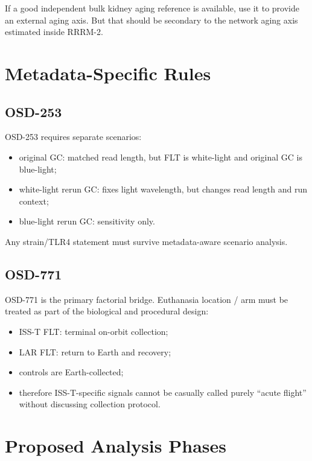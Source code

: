 \documentclass[11pt]{article}
\begin{document}
If a good independent bulk kidney aging reference is available, use it to provide
an external aging axis. But that should be secondary to the network aging axis
estimated inside RRRM-2.

\section{Metadata-Specific Rules}

\subsection{OSD-253}

OSD-253 requires separate scenarios:

\begin{itemize}
  \item original GC: matched read length, but FLT is white-light and original GC
        is blue-light;
  \item white-light rerun GC: fixes light wavelength, but changes read length and
        run context;
  \item blue-light rerun GC: sensitivity only.
\end{itemize}

Any strain/TLR4 statement must survive metadata-aware scenario analysis.

\subsection{OSD-771}

OSD-771 is the primary factorial bridge. Euthanasia location / arm must be treated
as part of the biological and procedural design:

\begin{itemize}
  \item ISS-T FLT: terminal on-orbit collection;
  \item LAR FLT: return to Earth and recovery;
  \item controls are Earth-collected;
  \item therefore ISS-T-specific signals cannot be casually called purely
        ``acute flight'' without discussing collection protocol.
\end{itemize}

\section{Proposed Analysis Phases}
\end{document}
